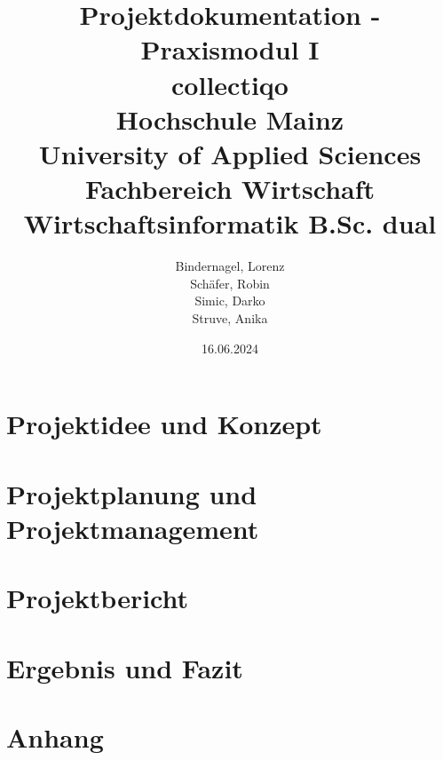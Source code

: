 \documentclass[a4paper, 12pt]{article}
\title{
        {\LARGE Projektdokumentation - Praxismodul I}\\
        {\LARGE collectiqo}\\
        {\small Hochschule Mainz}\\
        {\vspace{-0.5em}\small University of Applied Sciences}\\
        {\vspace{-0.5em}\small Fachbereich Wirtschaft}\\
        {\small Wirtschaftsinformatik B.Sc. dual}
}
\author{
    Bindernagel, Lorenz\\
    Schäfer, Robin\\
    Simic, Darko\\
    Struve, Anika
}
\date{16.06.2024}
\begin{document}
\begin{titlepage} %

    \maketitle
\end{titlepage}

    \newpage
    \tableofcontents
    \newpage


    \section{Projektidee und Konzept}\label{sec:idee-konzept}
    
    \newpage


    \section{Projektplanung und Projektmanagement}\label{sec:planung-management}
    
    \newpage


    \section{Projektbericht}\label{sec:projektberichts}
    
    \newpage


    \section{Ergebnis und Fazit}\label{sec:ergebnis-fazit}
    
    \newpage

    \appendix


    \section{Anhang}\label{sec:anhang}
    
\end{document}
